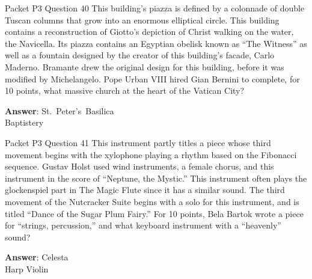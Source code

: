 \begin{frame}{Packet P3 Question 40}
This building's piazza   is defined by a colonnade of double Tuscan   columns that grow into an enormous elliptical circle. This building contains a reconstruction of     Giotto's depiction of Christ walking on the water, the Navicella. Its piazza contains an Egyptian obelisk known as ``The Witness'' as well as a fountain designed by the creator of this building's facade, Carlo Maderno. Bramante drew the original design for this building, before it was modified by Michelangelo. Pope Urban   VIII hired Gian Bernini to complete, for 10 points, what massive church at the heart of the Vatican City?

\textbf{Answer}: St.\ Peter's\ Basilica\\
 Baptistery
\end{frame}

\begin{frame}{Packet P3 Question 41}
This instrument partly titles a piece whose third movement begins with the xylophone playing a rhythm based on the Fibonacci sequence. Gustav Holst used wind instruments, a female chorus, and this instrument in the score of ``Neptune, the Mystic.'' This instrument often plays the glockenspiel part in The Magic Flute since it has a similar sound. The third movement of the Nutcracker Suite begins with a solo for this instrument, and is titled ``Dance of the Sugar Plum Fairy.'' For 10 points, Bela Bartok wrote a piece for ``strings,   percussion,''   and what keyboard instrument with a ``heavenly''   sound?  

\textbf{Answer}: Celesta\\
 Harp
 Violin
\end{frame}

